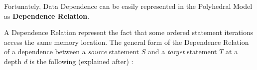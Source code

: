 \documentclass[paper=a4, fontsize=11.5pt]{scrartcl}
\numberwithin{equation}{section}        %
\numberwithin{figure}{section}          %
\numberwithin{table}{section}               %
\begin{document}
        Fortunately, Data Dependence can be easily represented in the Polyhedral Model as
        \textbf{Dependence Relation}.

        A Dependence Relation represent the fact that some ordered statement iterations
        access the same memory location. The general form of the Dependence Relation of
        a dependence between a \textit{source} statement $S$ and a \textit{target}
        statement $T$ at a depth $d$ is the following (explained after) :

        \begin{center}
\end{center}
\end{document}
